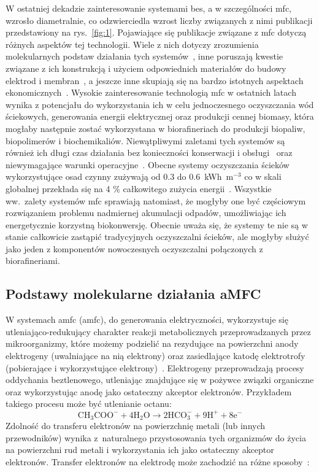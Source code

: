 W ostatniej dekadzie zainteresowanie systemami \acrshort{bes},
a w szczególności \acrshort{mfc}, wzrosło diametralnie, co odzwierciedla wzrost
liczby związanych z nimi publikacji przedstawiony na rys.~\ref{fig:1}.
Pojawiające się publikacje związane z \acrshort{mfc}
dotyczą różnych aspektów tej technologii.
Wiele z nich dotyczy zrozumienia molekularnych podstaw
działania tych systemów~\cite{Slate2019, Bruce2006, Lovley2006}, inne
poruszają kwestie związane z ich konstrukcją i użyciem odpowiednich
materiałów do budowy elektrod i membran~\cite{Kaur2020, Daud2015},
a jeszcze inne skupiają się na bardzo istotnych
aspektach ekonomicznych~\cite{Trapero2017}.
Wysokie zainteresowanie technologią \acrshort{mfc} w ostatnich latach wynika
z potencjału do wykorzystania ich w celu jednoczesnego oczyszczania
wód ściekowych, generowania energii elektrycznej oraz produkcji cennej biomasy,
która mogłaby następnie zostać wykorzystana w biorafineriach do produkcji
biopaliw, biopolimerów i biochemikaliów.
Niewątpliwymi zaletami tych systemów są również ich długi czas działania
bez konieczności konserwacji i obsługi~\cite{Habermann1991}
oraz niewymagające warunki operacyjne~\cite{Slate2019}.
Obecne systemy oczyszczania ścieków wykorzystujące osad czynny
zużywają od 0.3 do 0.6~kWh~m$^{-3}$ co w skali globalnej
przekłada się na 4 \% całkowitego zużycia energii~\cite{AlSayed2020}.
Wszystkie ww.\ zalety systemów \acrshort{mfc} sprawiają natomiast, że mogłyby one
być częściowym rozwiązaniem problemu nadmiernej akumulacji odpadów,
umożliwiając ich energetycznie korzystną biokonwersję.
Obecnie uważa się, że systemy te nie są w stanie całkowicie zastąpić
tradycyjnych oczyszczalni ścieków, ale mogłyby służyć
jako jeden z komponentów nowoczesnych oczyszczalni połączonych
z biorafineriami.

\subsection{Podstawy molekularne działania aMFC}\label{subsec:podstawy-molekularne}
W systemach \acrshort{amfc} (\acrlong{amfc}), do generowania elektryczności, wykorzystuje się
utleniająco-redukujący charakter reakcji metabolicznych
przeprowadzanych przez mikroorganizmy, które możemy podzielić
na rezydujące na powierzchni anody elektrogeny (uwalniające na nią
elektrony) oraz zasiedlające katodę elektrotrofy
(pobierające i wykorzystujące elektrony)~\cite{AlSayed2020}.
Elektrogeny przeprowadzają procesy oddychania beztlenowego,
utleniając znajdujące się w pożywce związki organiczne oraz
wykorzystując anodę jako ostateczny akceptor elektronów.
Przykładem takiego procesu może być utlenianie octanu:
\begin{equation}
    \label{eq:1}
    \mathrm{CH_3 COO^- + 4H_2 O \rightarrow 2HCO_3^- + 9H^+ + 8e^-}
\end{equation}
Zdolność do transferu elektronów na powierzchnię metali (lub
innych przewodników) wynika z~naturalnego przystosowania tych
organizmów do życia na powierzchni rud metali i wykorzystania
ich jako ostateczny akceptor elektronów.
Transfer elektronów na elektrodę może zachodzić na różne
sposoby~\cite{Santoro2017}:

